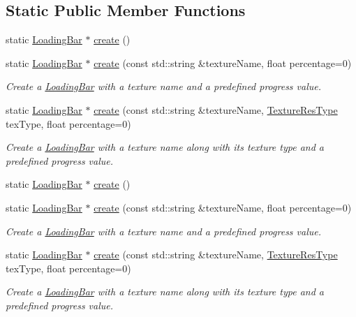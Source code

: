 \subsection*{Static Public Member Functions}
\begin{DoxyCompactItemize}
\item 
static \hyperlink{classui_1_1LoadingBar}{Loading\+Bar} $\ast$ \hyperlink{classui_1_1LoadingBar_afb0fdd00a7d0a95c64daf25701f671da}{create} ()
\item 
static \hyperlink{classui_1_1LoadingBar}{Loading\+Bar} $\ast$ \hyperlink{classui_1_1LoadingBar_af2148a31173a31b52ee5f4d756a14ae0}{create} (const std\+::string \&texture\+Name, float percentage=0)
\begin{DoxyCompactList}\small\item\em Create a \hyperlink{classui_1_1LoadingBar}{Loading\+Bar} with a texture name and a predefined progress value. \end{DoxyCompactList}\item 
static \hyperlink{classui_1_1LoadingBar}{Loading\+Bar} $\ast$ \hyperlink{classui_1_1LoadingBar_a10ff1c1ea945999c81cf26cd98f2b3d0}{create} (const std\+::string \&texture\+Name, \hyperlink{classui_1_1Widget_a040a65ec5ad3b11119b7e16b98bd9af0}{Texture\+Res\+Type} tex\+Type, float percentage=0)
\begin{DoxyCompactList}\small\item\em Create a \hyperlink{classui_1_1LoadingBar}{Loading\+Bar} with a texture name along with its texture type and a predefined progress value. \end{DoxyCompactList}\item 
static \hyperlink{classui_1_1LoadingBar}{Loading\+Bar} $\ast$ \hyperlink{classui_1_1LoadingBar_a6ecb712e35e109995a7a817432a447ae}{create} ()
\item 
static \hyperlink{classui_1_1LoadingBar}{Loading\+Bar} $\ast$ \hyperlink{classui_1_1LoadingBar_a5efe082b456c8a5c5c2dc264e7c96479}{create} (const std\+::string \&texture\+Name, float percentage=0)
\begin{DoxyCompactList}\small\item\em Create a \hyperlink{classui_1_1LoadingBar}{Loading\+Bar} with a texture name and a predefined progress value. \end{DoxyCompactList}\item 
static \hyperlink{classui_1_1LoadingBar}{Loading\+Bar} $\ast$ \hyperlink{classui_1_1LoadingBar_a3b234424d8b9c96d7c7f752b35882463}{create} (const std\+::string \&texture\+Name, \hyperlink{classui_1_1Widget_a040a65ec5ad3b11119b7e16b98bd9af0}{Texture\+Res\+Type} tex\+Type, float percentage=0)
\begin{DoxyCompactList}\small\item\em Create a \hyperlink{classui_1_1LoadingBar}{Loading\+Bar} with a texture name along with its texture type and a predefined progress value. \end{DoxyCompactList}\end{DoxyCompactItemize}
